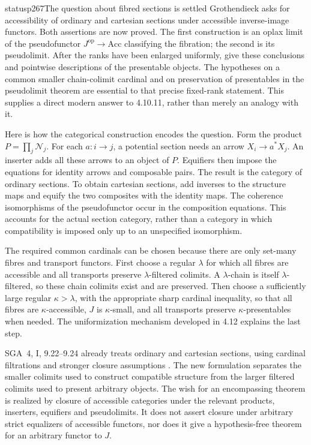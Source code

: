 \begin{dcomment}{status}{p267}{The question about fibred sections is settled}
Grothendieck asks for accessibility of ordinary and cartesian sections under accessible inverse-image functors. Both assertions are now proved. The first construction is an oplax limit of the pseudofunctor $J^{\mathrm{op}}\to\mathrm{Acc}$ classifying the fibration; the second is its pseudolimit. After the ranks have been enlarged uniformly, \citet[Theorems~8.1, 8.3 and Corollary~9.2]{Positselski2024Limits} give these conclusions and pointwise descriptions of the presentable objects. The hypotheses on a common smaller chain-colimit cardinal and on preservation of presentables in the pseudolimit theorem are essential to that precise fixed-rank statement. This supplies a direct modern answer to 4.10.11, rather than merely an analogy with it.

Here is how the categorical construction encodes the question. Form the product $P=\prod_j\mathcal N_j$. For each $a:i\to j$, a potential section needs an arrow $X_i\to a^*X_j$. An inserter adds all these arrows to an object of $P$. Equifiers then impose the equations for identity arrows and composable pairs. The result is the category of ordinary sections. To obtain cartesian sections, add inverses to the structure maps and equify the two composites with the identity maps. The coherence isomorphisms of the pseudofunctor occur in the composition equations. This accounts for the actual section category, rather than a category in which compatibility is imposed only up to an unspecified isomorphism.

The required common cardinals can be chosen because there are only set-many fibres and transport functors. First choose a regular $\lambda$ for which all fibres are accessible and all transports preserve $\lambda$-filtered colimits. A $\lambda$-chain is itself $\lambda$-filtered, so these chain colimits exist and are preserved. Then choose a sufficiently large regular $\kappa>\lambda$, with the appropriate sharp cardinal inequality, so that all fibres are $\kappa$-accessible, $J$ is $\kappa$-small, and all transports preserve $\kappa$-presentables when needed. The uniformization mechanism developed in 4.12 explains the last step.

SGA~4, I, 9.22--9.24 already treats ordinary and cartesian sections, using cardinal filtrations and stronger closure assumptions \citep{SGA4I1972}. The new formulation separates the smaller colimits used to construct compatible structure from the larger filtered colimits used to present arbitrary objects. The wish for an encompassing theorem is realized by closure of accessible categories under the relevant products, inserters, equifiers and pseudolimits. It does not assert closure under arbitrary strict equalizers of accessible functors, nor does it give a hypothesis-free theorem for an arbitrary functor to $J$.
\end{dcomment}


